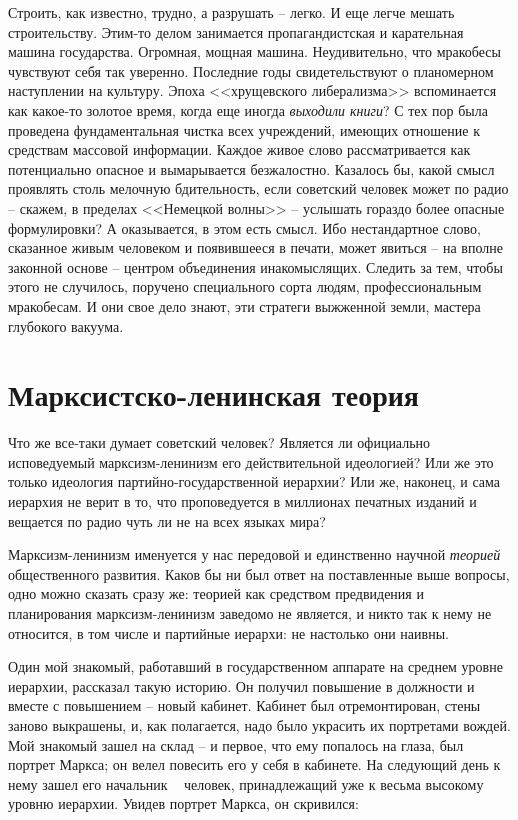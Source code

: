 \documentclass{book}
\begin{document}
Строить, как известно, трудно, а разрушать -- легко. И еще легче мешать строительству. Этим-то делом занимается пропагандистская 
и карательная машина государства. Огромная, мощная машина. Неудивительно, что мракобесы чувствуют себя так уверенно. Последние 
годы свидетельствуют о планомерном наступлении на культуру. Эпоха <<хрущевского либе­рализма>> вспоминается как какое-то золотое 
время, когда еще иногда \textit{выходили книги}?  С тех пор была проведена фундаментальная чистка всех учреждений, имеющих отношение к 
средствам массовой информации. Каждое живое слово рассматривается как потенциально опасное и вымарывается безжалостно. Казалось 
бы, какой смысл проявлять столь мелочную бдительность, если советский человек может по радио -- скажем, в пределах <<Немецкой 
волны>> -- услышать гораздо более опасные формулировки? А оказывается, в этом есть смысл. Ибо нестандартное слово, сказанное 
живым человеком и появившееся в печати, может явиться -- на вполне законной основе -- центром объединения инакомыслящих. Следить 
за тем, чтобы этого не случилось, поручено специального сорта людям, профессиональным мракобесам. И они свое дело знают, эти 
стратеги выжженной земли, мастера глубокого вакуума.


\section{Марксистско-ленинская теория}


Что же все-таки думает советский человек? Является ли официально исповедуемый марксизм-ленинизм его действи­тельной идеологией? Или же это только идеология пар\-тий\-но-государственной иерархии? Или же, наконец, и сама иерархия не верит в то, что проповедуется в миллионах печатных изда­ний и вещается по радио чуть ли не на всех языках мира?

Марксизм-ленинизм именуется у нас передовой и единствен­но научной \textit{теорией}  общественного развития. Каков бы ни был ответ на поставленные выше вопросы, одно можно сказать сразу же: теорией как средством предвидения и планирования марксизм-ленинизм заведомо не является, и никто так к нему не относится, в том числе и партийные иерархи: не настолько они наивны.

Один мой знакомый, работавший в государственном аппа­рате на среднем уровне иерархии, рассказал такую историю. Он получил повышение в должности и вместе с повышением -- новый кабинет. Кабинет был отремонтирован, стены заново выкрашены, и, как полагается, надо было украсить их порт­ретами вождей. Мой знакомый зашел на склад -- и первое, что ему попалось на глаза, был портрет Маркса; он велел пове­сить его у себя в кабинете. На следующий день к нему зашел его начальник ~ человек, принадлежащий уже к весьма высо­кому уровню иерархии. Увидев портрет Маркса, он скривился:
\end{document}
